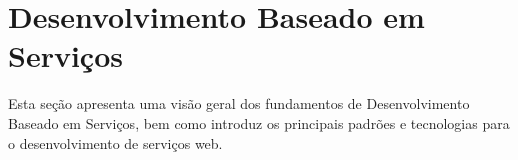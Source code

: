 \section{Desenvolvimento Baseado em Serviços}\label{2-fundamentacao-dbs}

Esta seção apresenta uma visão geral dos fundamentos de Desenvolvimento Baseado em Serviços, bem como introduz os principais padrões e tecnologias para o desenvolvimento de serviços web.


